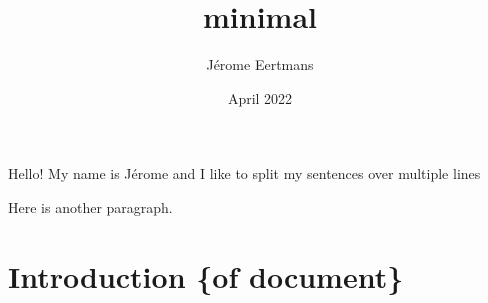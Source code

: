 \documentclass{article}
\title{minimal}
\author{Jérome Eertmans}
\date{April 2022}
\begin{document}
\maketitle

Hello! My name is Jérome and I like to
split my sentences over multiple lines

Here is another paragraph.

\section{Introduction \{of document\}}
\end{document}
